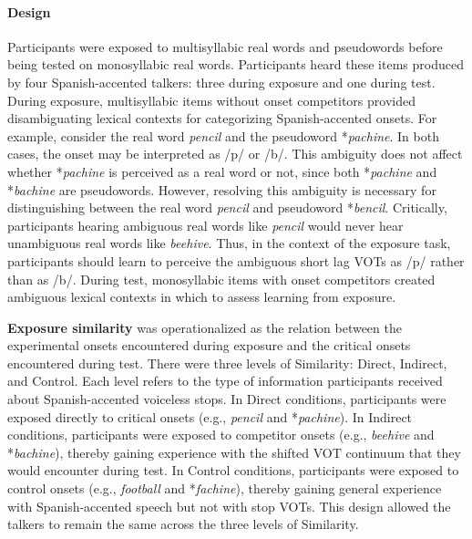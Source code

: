 \documentclass[
  12pt,
  twoside]{article}
\begin{document}
\hypertarget{methods-design-1a}{%
\paragraph{Design}\label{methods-design-1a}}

Participants were exposed to multisyllabic real words and pseudowords before being tested on monosyllabic real words.
Participants heard these items produced by four Spanish-accented talkers: three during exposure and one during test.
During exposure, multisyllabic items without onset competitors provided disambiguating lexical contexts for categorizing Spanish-accented onsets.
For example, consider the real word \emph{pencil} and the pseudoword *\emph{pachine}.
In both cases, the onset may be interpreted as /p/ or /b/.
This ambiguity does not affect whether *\emph{pachine} is perceived as a real word or not, since both *\emph{pachine} and *\emph{bachine} are pseudowords.
However, resolving this ambiguity is necessary for distinguishing between the real word \emph{pencil} and pseudoword *\emph{bencil}.
Critically, participants hearing ambiguous real words like \emph{pencil} would never hear unambiguous real words like \emph{beehive}.
Thus, in the context of the exposure task, participants should learn to perceive the ambiguous short lag VOTs as /p/ rather than as /b/.
During test, monosyllabic items with onset competitors created ambiguous lexical contexts in which to assess learning from exposure.

\textbf{Exposure similarity} was operationalized as the relation between the experimental onsets encountered during exposure and the critical onsets encountered during test.
There were three levels of Similarity: Direct, Indirect, and Control.
Each level refers to the type of information participants received about Spanish-accented voiceless stops.
In Direct conditions, participants were exposed directly to critical onsets (e.g., \emph{pencil} and *\emph{pachine}).
In Indirect conditions, participants were exposed to competitor onsets (e.g., \emph{beehive} and *\emph{bachine}), thereby gaining experience with the shifted VOT continuum that they would encounter during test.
In Control conditions, participants were exposed to control onsets (e.g., \emph{football} and *\emph{fachine}), thereby gaining general experience with Spanish-accented speech but not with stop VOTs.
This design allowed the talkers to remain the same across the three levels of Similarity.
\end{document}
